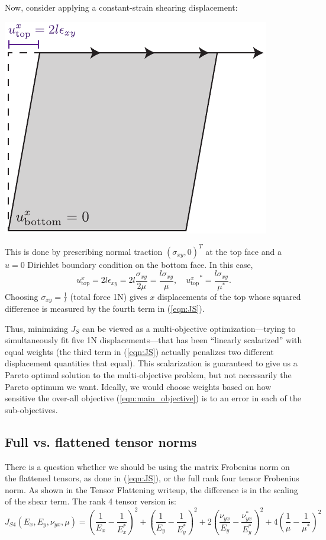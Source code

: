 \documentclass[10pt]{article}
\begin{document}
Now, consider applying a constant-strain shearing displacement:
\\
\begin{minipage}{\linewidth}
    \centering
    \includegraphics[width=.35\textwidth]{shear_load.pdf}
\end{minipage}
This is done by prescribing normal traction $(\sigma_{xy}, 0)^T$ at the top
face and a $u = 0$ Dirichlet boundary condition on the bottom face. In this case, 
$$
u^x_\text{top} = 2 l \epsilon_{xy} = 2 l \frac{\sigma_{xy}}{2 \mu} = \frac{l \sigma_{xy}}{\mu},\quad
{u^x_\text{top}}^* = \frac{l \sigma_{xy}}{\mu^*}.
$$
Choosing $\sigma_{xy} = \frac{1}{l}$ (total force 1N) gives $x$ displacements
of the top whose squared difference is measured by the fourth term in (\ref{eqn:JS}).

Thus, minimizing $J_S$ can be viewed as a multi-objective optimization---trying
to simultaneously fit five 1N displacements---that has been ``linearly
scalarized'' with equal weights (the third term in (\ref{eqn:JS}) actually
penalizes two different displacement quantities that equal). This scalarization
is guaranteed to give us a Pareto optimal solution to the multi-objective
problem, but not necessarily the Pareto optimum we want. Ideally, we would
choose weights based on how sensitive the over-all objective
(\ref{eqn:main_objective}) is to an error in each of the sub-objectives.

\subsection{Full vs. flattened tensor norms}
There is a question whether we should be using the matrix Frobenius norm on the
flattened tensors, as done in (\ref{eqn:JS}), or the full rank four tensor
Frobenius norm. As shown in the Tensor Flattening writeup, the difference is in
the scaling of the shear term. The rank 4 tensor version is:
\begin{equation}
    \label{eqn:JS4}
J_{S4}(E_x, E_y, \nu_{yx}, \mu) = 
\left(\frac{1}{E_x} - \frac{1}{E_x^*}\right)^2 +
\left(\frac{1}{E_y} - \frac{1}{E_y^*}\right)^2 +
2 \left(\frac{\nu_{yx}}{E_y} - \frac{\nu_{yx}^*}{E_y^*}\right)^2 +
4 \left(\frac{1}{\mu} - \frac{1}{\mu^*}\right)^2
\end{equation}
\end{document}
